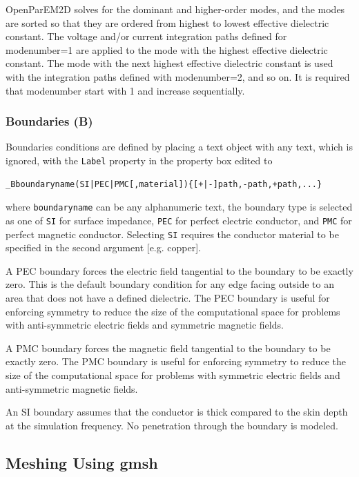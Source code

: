 \documentclass[titlepage]{article}
\renewcommand\_{\textunderscore\linebreak[1]}
\begin{document}
OpenParEM2D solves for the dominant and higher-order modes, and the modes are sorted so that they are ordered from highest to lowest effective dielectric constant.  The voltage and/or current integration paths defined for modenumber=1 are applied to the mode with the highest effective dielectric constant. The mode with the next highest effective dielectric constant is used with the integration paths defined with modenumber=2, and so on.  It is required that modenumber start with 1 and increase sequentially.

\subsubsection{Boundaries (\_B)}

Boundaries conditions are defined by placing a text object with any text, which is ignored, with the \texttt{Label} property in the property box edited to
\begin{Verbatim}[fontsize=\small]
  _Bboundaryname(SI|PEC|PMC[,material]){[+|-]path,-path,+path,...}
\end{Verbatim}
\noindent where \texttt{boundaryname} can be any alphanumeric text, the boundary type is selected as one of \texttt{SI} for surface impedance, \texttt{PEC} for perfect electric conductor, and \texttt{PMC} for perfect magnetic conductor.  Selecting \texttt{SI} requires the conductor material to be specified in the second argument [e.g. copper].

A PEC boundary forces the electric field tangential to the boundary to be exactly zero.  This is the default boundary condition for any edge facing outside to an area that does not have a defined dielectric.
 The PEC boundary is useful for enforcing symmetry to reduce the size of the computational space for problems with anti-symmetric electric fields and symmetric magnetic fields.

A PMC boundary forces the magnetic field tangential to the boundary to be exactly zero.  The PMC boundary is useful for enforcing symmetry to reduce the size of the computational space for problems with symmetric electric fields and anti-symmetric magnetic fields.

An SI boundary assumes that the conductor is thick compared to the skin depth at the simulation frequency.  No penetration through the boundary is modeled.

\subsection{Meshing Using gmsh}
\label{sec:gmsh}
\end{document}
